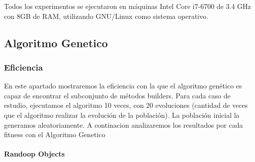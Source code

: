 Todos los experimentos se ejecutaron en máquinas Intel Core i7-6700 de 3.4 GHz con 8GB de RAM, utilizando GNU/Linux como sistema operativo.

\subsection{Algoritmo Genetico}

\subsubsection{Eficiencia}

En este apartado mostraremos la eficiencia con la que el algoritmo genético es capaz de encontrar el subconjunto de métodos builders. Para cada caso de estudio, ejecutamos el algoritmo 10 veces, con 20 evoluciones (cantidad de veces que el algoritmo realizar la evolución de la población). La población inicial la generamos aleatoriamente. 
A continacion analizaremos los resultados por cada fitness con el Algoritmo Genetico


\paragraph{Randoop Objects}

